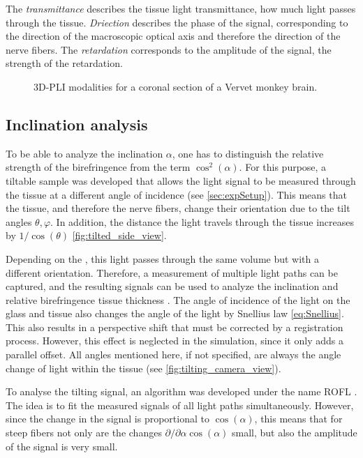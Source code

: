 %
The \textit{transmittance} describes the tissue light transmittance, \ie{} how much light passes through the tissue.
\textit{Driection} describes the phase of the signal, corresponding to the direction of the macroscopic optical axis and therefore the direction of the nerve fibers.
The \textit{retardation} corresponds to the amplitude of the signal, \ie{} the strength of the retardation.
%
\begin{figure}[t]

\caption[3D-PLI modalities]{3D-PLI modalities for a coronal section of a Vervet monkey brain.}
\end{figure}
%
%
\subsection{Inclination analysis} \label{sec::InclAnalysis}
%
To be able to analyze the inclination $\alpha$, one has to distinguish the relative strength of the birefringence from the term $\cos^2(\alpha)$.
For this purpose, a tiltable sample was developed that allows the light signal to be measured through the tissue at a different angle of incidence \cite{Axer2011, Wiese:887678} (see \cref{sec:expSetup}).
This means that the tissue, and therefore the nerve fibers, change their orientation due to the tilt angles $\theta, \varphi$.
In addition, the distance the light travels through the tissue increases by $1/\cos(\theta)$ \cref{fig:tilted_side_view}.
\par
%
Depending on the \Pixelsize{}, this light passes through the same volume but with a different orientation.
Therefore, a measurement of multiple light paths can be captured, and the resulting signals can be used to analyze the inclination and relative birefringence tissue thickness \trel{}.
The angle of incidence of the light on the glass and tissue also changes the angle of the light by Snellius law \cref{eq:Snellius}.
This also results in a perspective shift that must be corrected by a registration process.
However, this effect is neglected in the simulation, since it only adds a parallel offset.
All angles mentioned here, if not specified, are always the angle change of light within the tissue (see \cref{fig:tilting_camera_view}).
\par
%
To analyse the tilting signal, an algorithm was developed under the name \ac{ROFL} \cite{Wiese:887678,Schmitz2018}.
The idea is to fit the measured signals of all light paths simultaneously.
However, since the change in the signal is proportional to $\cos(\alpha)$, this means that for steep fibers not only are the changes $\partial / \partial \alpha \cos(\alpha)$ small, but also the amplitude of the signal is very small.
